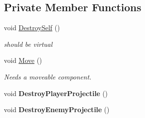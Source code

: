 \subsection*{Private Member Functions}
\begin{DoxyCompactItemize}
\item 
void \hyperlink{class_projectile_ac128cf116d9fd114bce2a49af797da1f}{Destroy\+Self} ()
\begin{DoxyCompactList}\small\item\em should be virtual \end{DoxyCompactList}\item 
\mbox{\label{class_projectile_a52c04ac421a4add1a2920bd57eb56fe5}} 
void \hyperlink{class_projectile_a52c04ac421a4add1a2920bd57eb56fe5}{Move} ()
\begin{DoxyCompactList}\small\item\em Needs a moveable component. \end{DoxyCompactList}\item 
\mbox{\label{class_projectile_a28ae398ce317354ed435019e6b50c4ff}} 
void {\bfseries Destroy\+Player\+Projectile} ()
\item 
\mbox{\label{class_projectile_a2ece9bc68fb806b8ac7eababcc3ac9f1}} 
void {\bfseries Destroy\+Enemy\+Projectile} ()
\end{DoxyCompactItemize}
